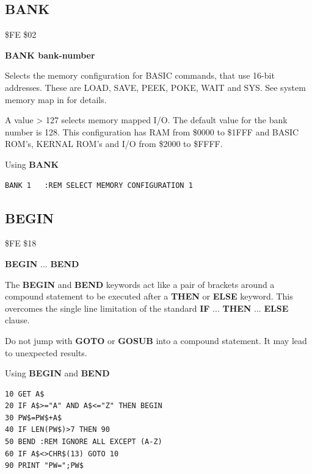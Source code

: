 \subsection{BANK}
\begin{description}[leftmargin=2cm,style=nextline]
\item [Token:] \$FE \$02
\item [Format:] {\bf BANK bank-number}
\item [Usage:] Selects the memory configuration
               for BASIC commands, that use 16-bit addresses.
               These are LOAD, SAVE, PEEK, POKE, WAIT and SYS.
               See system memory map in  for details.
\item [Remarks:] A value > 127 selects memory mapped I/O.
                 The default value for the bank number is 128.
                 This configuration has RAM from \$0000 to \$1FFF
                 and BASIC ROM's, KERNAL ROM's and I/O from \$2000 to \$FFFF.
\item [Example:] Using {\bf BANK}
\begin{tcolorbox}[colback=black,coltext=white]
\verbatimfont{\codefont}
\begin{verbatim}
BANK 1   :REM SELECT MEMORY CONFIGURATION 1
\end{verbatim}
\end{tcolorbox}
\end{description}


\newpage
\subsection{BEGIN}
\begin{description}[leftmargin=2cm,style=nextline]
\item [Token:] \$FE \$18
\item [Format:] {\bf BEGIN} ... {\bf BEND}
\item [Usage:] The {\bf BEGIN} and {\bf BEND} keywords act like
               a pair of brackets around a compound statement
               to be executed after a {\bf THEN} or {\bf ELSE} keyword.
               This overcomes the single line limitation of the
               standard {\bf IF} ... {\bf THEN} ... {\bf ELSE} clause.
\item [Remarks:] Do not jump with {\bf GOTO} or {\bf GOSUB} into a
                 compound statement. It may lead to unexpected
                 results.
\item [Example:] Using {\bf BEGIN} and {\bf BEND}
\begin{tcolorbox}[colback=black,coltext=white]
\verbatimfont{\codefont}
\begin{verbatim}
10 GET A$
20 IF A$>="A" AND A$<="Z" THEN BEGIN
30 PW$=PW$+A$
40 IF LEN(PW$)>7 THEN 90
50 BEND :REM IGNORE ALL EXCEPT (A-Z)
60 IF A$<>CHR$(13) GOTO 10
90 PRINT "PW=";PW$
\end{verbatim}
\end{tcolorbox}
\end{description}

